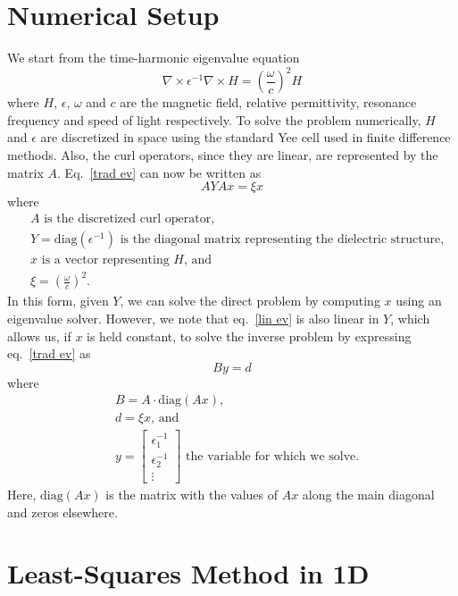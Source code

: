 \documentclass[10pt,letterpaper]{article}
\begin{document}
\section{Numerical Setup}
We start from the time-harmonic eigenvalue equation 
\begin{equation}
\nabla \times \epsilon^{-1} \nabla \times H = \left(\frac{\omega}{c}\right)^2 H
\label{trad ev}\end{equation}
where $H$, $\epsilon$, $\omega$ and $c$ are the magnetic field, relative permittivity, resonance frequency and speed of light respectively. To solve the problem numerically, $H$ and $\epsilon$ are discretized in space using the standard Yee cell used in finite difference methods\cite{Yee66}. Also, the curl operators, since they are linear, are represented by the matrix $A$. Eq.~\eqref{trad ev} can now be written as 
\begin{equation}
A Y A x = \xi x
\label{lin ev}\end{equation}
where
\begin{align*}
&A \text{ is the discretized curl operator,} \\
&Y = \text{diag}(\epsilon^{-1}) \text{ is the diagonal matrix representing the dielectric structure,} \\
&x \text{ is a vector representing $H$, and} \\
&\xi =  \left(\frac{\omega}{c}\right)^2. 
\end{align*}
In this form, given $Y$, we can solve the direct problem by computing $x$ using an eigenvalue solver\cite{JJ99}. However, we note that eq.~\eqref{lin ev} is also linear in $Y$, which allows us, if $x$ is held constant, to solve the inverse problem by expressing eq.~\eqref{trad ev} as
\begin{equation}
By = d
\label{inv ls}\end{equation}
where
\begin{align*}
&B = A \cdot \text{diag}(Ax), \\
&d = \xi x\text{, and} \\
&y = 
\begin{bmatrix}
\epsilon_1^{-1} \\ \epsilon_2^{-1} \\ \vdots
\end{bmatrix} \text{ the variable for which we solve.}
\end{align*}
Here, $\text{diag}(Ax)$ is the matrix with the values of $Ax$ along the main diagonal and zeros elsewhere.

\section{Least-Squares Method in 1D}
\end{document}
